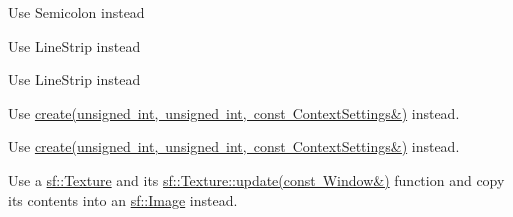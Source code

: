 \begin{DoxyRefList}
\label{deprecated__deprecated000022}%
%
Use Semicolon instead  
\item[Member \mbox{\hyperlink{group__graphics_gga5ee56ac1339984909610713096283b1bafc070260a0222df367922706bbeb905a}{sf\+::Lines\+Strip}} ]\label{deprecated__deprecated000001}%
%
Use Line\+Strip instead 

\label{deprecated__deprecated000024}%
%
Use Line\+Strip instead  
\item[Member \mbox{\hyperlink{classsf_1_1_render_texture_aaec1fb8ee77844da50b0143cb41c8a71}{sf\+::Render\+Texture\+::create}} (unsigned int width, unsigned int height, bool depth\+Buffer)]\label{deprecated__deprecated000004}%
%
Use \mbox{\hyperlink{classsf_1_1_render_texture_a49b7b723a80f89bc409a942364351dc3}{create(unsigned int, unsigned int, const Context\+Settings\&)}} instead.

\label{deprecated__deprecated000027}%
%
Use \mbox{\hyperlink{classsf_1_1_render_texture_a49b7b723a80f89bc409a942364351dc3}{create(unsigned int, unsigned int, const Context\+Settings\&)}} instead. 
\item[Member \mbox{\hyperlink{classsf_1_1_render_window_a370137abe81f6b7d62b600ceeccd54d3}{sf\+::Render\+Window\+::capture}} () const]\label{deprecated__deprecated000005}%
%
 Use a \mbox{\hyperlink{classsf_1_1_texture}{sf\+::\+Texture}} and its \mbox{\hyperlink{classsf_1_1_texture_ad3cceef238f7d5d2108a98dd38c17fc5}{sf\+::\+Texture\+::update(const Window\&)}} function and copy its contents into an \mbox{\hyperlink{classsf_1_1_image}{sf\+::\+Image}} instead. 


\end{DoxyRefList}
